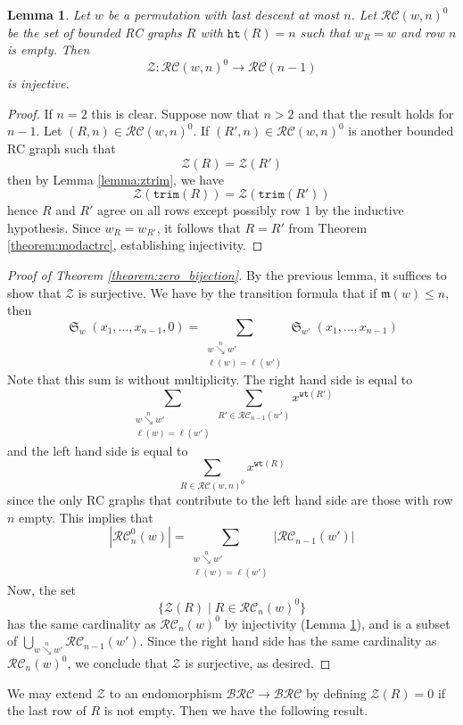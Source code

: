 \documentclass{amsart}
\newtheorem{lemma}{Lemma}[subsection]
\theoremstyle{definition}
\theoremstyle{remark}
\numberwithin{equation}{subsection}
\DeclareMathOperator{\sch}{\mathfrak{S}}
\newcommand{\downvar}[1]{\stackrel{#1}{\searrow}}
\newcommand{\wof}[1]{w_{#1}}
\newcommand{\wtt}{\mathtt{wt}}
\newcommand{\trm}{\mathtt{trim}}
\newcommand{\zeromap}{\mathcal{Z}}
\newcommand{\hr}{\mathtt{ht}}
\newcommand{\BRC}{\mathcal{BRC}}
\newcommand{\RC}{\mathcal{RC}}
\newcommand{\maxd}{\mathfrak{m}}
\begin{document}
\begin{lemma} \label{lemma:zero_injective}
Let $w$ be a permutation with last descent at most $n$. Let $\mathcal{RC}(w,n)^0$ be the set of bounded RC graphs $R$ with $\hr(R) = n$ such that $\wof{R}=w$ and row $n$ is empty. Then
$$\zeromap:\mathcal{RC}(w, n)^{0}\to \mathcal{RC}(n-1)$$
is injective.
\end{lemma}
\begin{proof}
If $n=2$ this is clear. Suppose now that $n > 2$ and that the result holds for $n-1$. Let $(R, n)\in \mathcal{RC}(w, n)^0$. If $(R', n)\in\mathcal{RC}(w,n)^0$ is another bounded RC graph such that
$$\zeromap(R) = \zeromap(R')$$
then by Lemma \ref{lemma:ztrim}, we have
$$\zeromap(\trm(R)) = \zeromap(\trm(R'))$$
hence $R$ and $R'$ agree on all rows except possibly row $1$ by the inductive hypothesis. Since $\wof{R} = \wof{R'}$, it follows that $R = R'$ from Theorem \ref{theorem:modactrc}, establishing injectivity.
\end{proof}

\begin{proof}[Proof of Theorem \ref{theorem:zero_bijection}]
By the previous lemma, it suffices to show that $\zeromap$ is surjective. We have by the transition formula that if $\maxd(w)\leq n$, then
$$\sch_w(x_1,\ldots,x_{n-1},0) = \sum_{\substack{w\downvar{n} w'\\\ell(w)=\ell(w')}}\sch_{w'}(x_1,\ldots,x_{n-1})$$
Note that this sum is without multiplicity. The right hand side is equal to
$$\sum_{\substack{w\downvar{n} w'\\\ell(w)=\ell(w')}}\sum_{R'\in \RC_{n-1}(w')}x^{\wtt(R')}$$
and the left hand side is equal to
$$\sum_{R\in \mathcal{RC}(w, n)^0}x^{\wtt(R)}$$
since the only RC graphs that contribute to the left hand side are those with row $n$ empty. This implies that
$$|\RC_n^0(w)| = \sum_{\substack{w\downvar{n} w'\\\ell(w)=\ell(w')}}|\RC_{n-1}(w')|$$
Now, the set 
$$\{\zeromap(R) \mid R\in \mathcal{RC}_n(w)^0\}$$
has the same cardinality as $\mathcal{RC}_n(w)^0$ by injectivity (Lemma \ref{lemma:zero_injective}), and is a subset of $\bigcup_{w\downvar{n} w'}\mathcal{RC}_{n-1}(w')$. Since the right hand side has the same cardinality as $\mathcal{RC}_n(w)^0$, we conclude that $\zeromap$ is surjective, as desired.
\end{proof}


We may extend $\zeromap$ to an endomorphism $\BRC\to\BRC$ by defining $\zeromap(R) = 0$ if the last row of $R$ is not empty. Then we have the following result.
\end{document}
